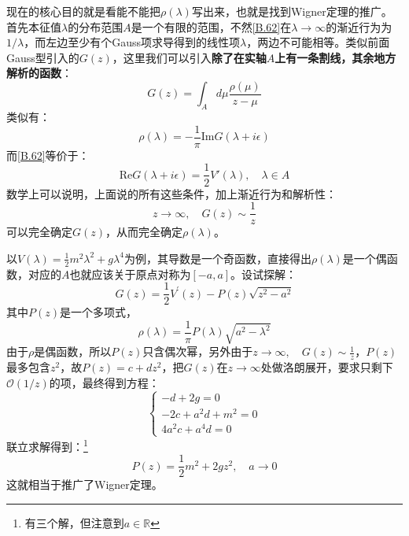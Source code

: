 现在的核心目的就是看能不能把$\rho(\lambda)$写出来，也就是找到Wigner定理的推广。首先本征值$\lambda$的分布范围$A$是一个有限的范围，不然\ref{B.62}在$\lambda\to\infty$的渐近行为为$1/\lambda$，而左边至少有个Gauss项求导得到的线性项$\lambda$，两边不可能相等。类似前面Gauss型引入的$G(z)$，这里我们可以引入\textbf{除了在实轴$A$上有一条割线，其余地方解析的函数}：
\begin{equation}
	G(z)=\int_Ad\mu\frac{\rho(\mu)}{z-\mu}
\end{equation}
类似有：
\begin{equation}
	\rho(\lambda)=-\frac{1}{\pi}\mathrm{Im}G(\lambda+i\epsilon)
\end{equation}
而\ref{B.62}等价于：
\begin{equation}
	\mathrm{Re}G(\lambda+i\epsilon)=\frac{1}{2}V'(\lambda),\quad\lambda\in A
\end{equation}
数学上可以说明，上面说的所有这些条件，加上渐近行为和解析性：
\begin{equation}
	z\to\infty,\quad G(z)\sim\frac1z
\end{equation}
可以完全确定$G(z)$，从而完全确定$\rho(\lambda)$。
\begin{example}
	以$V(\lambda)=\frac{1}{2}m^{2}\lambda^{2}+g\lambda^{4}$为例，其导数是一个奇函数，直接得出$\rho(\lambda)$是一个偶函数，对应的$A$也就应该关于原点对称为$[-a,a]$。设试探解：
	\begin{equation}
		G(z)=\frac12V^{\prime}(z)-P(z)\sqrt{z^2-a^2}
	\end{equation}
	其中$P(z)$是一个多项式，
	\begin{equation}
		\rho(\lambda)=\frac1\pi P(\lambda)\sqrt{a^2-\lambda^2}
	\end{equation}
	由于$\rho$是偶函数，所以$P(z)$只含偶次幂，另外由于$z\to\infty,\quad G(z)\sim\frac1z$，$P(z)$最多包含$z^2$，故$P(z)=c+dz^2$，把$G(z)$在$z\to\infty$处做洛朗展开，要求只剩下$\mathcal{O}(1/z)$的项，最终得到方程：
	\begin{equation}
		\begin{cases}
			-d+2g=0\\
			-2c+a^2d+m^2=0\\
			4a^2c+a^4d=0
		\end{cases}
	\end{equation}
	联立求解得到：\footnote{有三个解，但注意到$a\in\mathbb{R}$}
	\begin{equation}
		P(z)=\frac{1}{2}m^2+2gz^2,\quad a\to 0
	\end{equation}
	这就相当于推广了Wigner定理。
\end{example}
